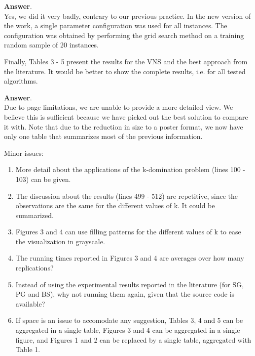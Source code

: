 \documentclass [11pt]{scrartcl}
\begin{document}
\textbf{Answer}. \\
Yes, we did it very badly, contrary to our previous practice. In the new version of the work, a single parameter configuration was used for all instances. The configuration was obtained by performing the grid search method on a training random sample of 20 instances.

\begin{leftbar}
Finally, Tables 3 - 5 present the results for the VNS and the best approach from the literature. It would be better to show the complete results, i.e. for all tested algorithms.
	
\end{leftbar}

\textbf{Answer}. \\
Due to page limitations, we are unable to provide a more detailed view. We believe this is sufficient because we have picked out the best solution to compare it with.
Note that due to the reduction in size to a poster format, we now have only one table that summarizes most of the previous information.


\begin{leftbar}
Minor issues:
\begin{enumerate}
  \item More detail about the applications of the k-domination problem (lines 100 - 103) can be given.
  \item The discussion about the results (lines 499 - 512) are repetitive, since the observations are the same for the different values of k. It could be summarized.
  \item Figures 3 and 4 can use filling patterns for the different values of k to ease the visualization in grayscale.
  \item The running times reported in Figures 3 and 4 are averages over how many replications?
  \item Instead of using the experimental results reported in the literature (for SG, PG and BS), why not running them again, given that the source code is available?
  \item If space is an issue to accomodate any suggestion, Tables 3, 4 and 5 can be aggregated in a single table, Figures 3 and 4 can be aggregated in a single figure, and Figures 1 and 2 can be replaced by a single table, aggregated with Table 1.
\end{enumerate}
    
    
\end{leftbar}
\end{document}
